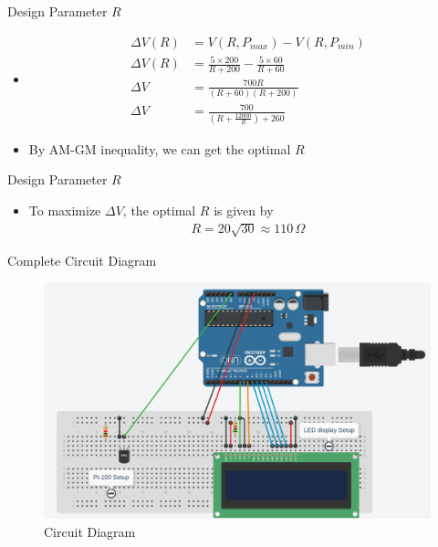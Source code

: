 \documentclass[10pt]{beamer}
\providecommand{\brak}[1]{\ensuremath{\left(#1\right)}}
\begin{document}
\begin{frame}{Design Parameter $R$}

\begin{itemize}
\item 
\begin{align} 
\Delta V\brak{R} &= V \brak{R, P_{max}} - V \brak{R, P_{min}} \\
\Delta V\brak{R} &= \frac{5 \times 200}{R + 200} - \frac{5 \times 60}{R + 60}\\
\Delta V &= \frac{700R}{\brak{R+60}\brak{R+200}}\\
\Delta V &= \frac{700}{\brak{R + \frac{12000}{R}} + 260}
\end{align}
\item By AM-GM inequality, we can get the optimal $R$
\end{itemize}
\end{frame}

\begin{frame}{Design Parameter $R$}
\begin{itemize} 
\item To maximize $\Delta V$, the optimal $R$ is given by
\begin{align}
R = 20\sqrt{30} \approx 110 \, \Omega
\end{align}
\end{itemize}
\end{frame}

\begin{frame}{Complete Circuit Diagram}
\begin{figure}[ht]
    \centering
    \includegraphics[scale = 0.22]{figs/Circuit.png}
    \caption{Circuit Diagram}
    \label{fig:2}
\end{figure}
\end{frame}
\end{document}
